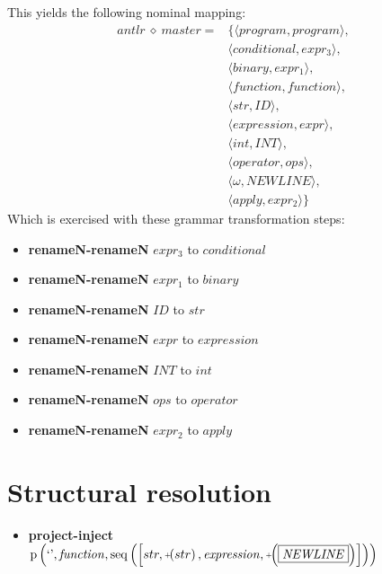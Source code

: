 This yields the following nominal mapping:
\begin{align*}\mathit{antlr} \:\diamond\: \mathit{master} =& \{\langle \mathit{program},\mathit{program}\rangle,\\
 & \langle \mathit{conditional},\mathit{expr_3}\rangle,\\
 & \langle \mathit{binary},\mathit{expr_1}\rangle,\\
 & \langle \mathit{function},\mathit{function}\rangle,\\
 & \langle str,\mathit{ID}\rangle,\\
 & \langle \mathit{expression},\mathit{expr}\rangle,\\
 & \langle int,\mathit{INT}\rangle,\\
 & \langle \mathit{operator},\mathit{ops}\rangle,\\
 & \langle \omega,\mathit{NEWLINE}\rangle,\\
 & \langle \mathit{apply},\mathit{expr_2}\rangle\}\end{align*}
 Which is exercised with these grammar transformation steps:

{\footnotesize\begin{itemize}
\item \textbf{renameN-renameN} $\mathit{expr_3}$ to $\mathit{conditional}$
\item \textbf{renameN-renameN} $\mathit{expr_1}$ to $\mathit{binary}$
\item \textbf{renameN-renameN} $\mathit{ID}$ to $str$
\item \textbf{renameN-renameN} $\mathit{expr}$ to $\mathit{expression}$
\item \textbf{renameN-renameN} $\mathit{INT}$ to $int$
\item \textbf{renameN-renameN} $\mathit{ops}$ to $\mathit{operator}$
\item \textbf{renameN-renameN} $\mathit{expr_2}$ to $\mathit{apply}$
\end{itemize}}

\section{Structural resolution}
{\footnotesize\begin{itemize}
\item \textbf{project-inject}\\$\mathrm{p}\left(\text{`'},\mathit{function},\mathrm{seq}\left(\left[str, \plus \left(str\right), \mathit{expression}, \plus \left(\fbox{$\mathit{NEWLINE}$}\right)\right]\right)\right)$
\end{itemize}}

